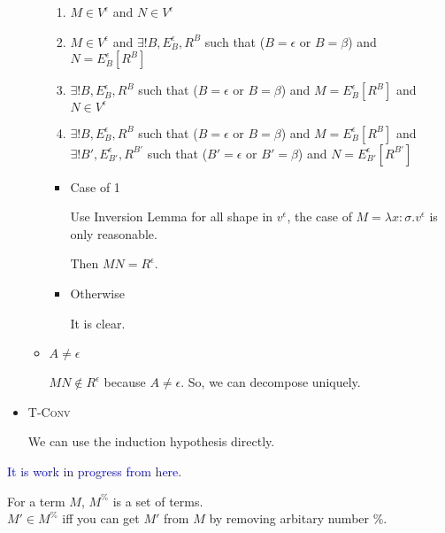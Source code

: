 \documentclass[9pt, a4paper]{extarticle}
\theoremstyle{break}
\newcommand{\TConv}{\textsc{T-Conv}}
\newcommand{\blue}[1]{\textcolor{blue}{ #1 }}
\begin{document}
\begin{itemize}
\begin{itemize}
		            \begin{enumerate}
			            \item $ M \in V^\epsilon$ and $ N \in V^\epsilon$
			            \item $ M \in V^\epsilon$ and $\exists ! B, E^\epsilon_B, R^B$ such that ($B = \epsilon$ or $B = \beta$) and $N = E^\epsilon_B[R^B]$
			            \item $\exists ! B, E^\epsilon_B, R^B$ such that ($B = \epsilon$ or $B = \beta$) and $M = E^\epsilon_B[R^B]$ and $ N \in V^\epsilon$
			            \item $\exists ! B, E^\epsilon_B, R^B$ such that ($B = \epsilon$ or $B = \beta$) and $M = E^\epsilon_B[R^B]$ and $\exists ! B', E^\epsilon_{B'}, R^{B'}$ such that ($B' = \epsilon$ or $B' = \beta$) and $N = E^\epsilon_{B'}[R^{B'}]$
		            \end{enumerate}

		            \begin{itemize}
			            \item Case of 1

			                  Use Inversion Lemma for all shape in $v^\epsilon$, the case of $ M = \lambda x:\sigma.v^\epsilon$ is only reasonable.

			                  Then $M N = R^\epsilon$.

			            \item Otherwise

			                  It is clear.
		            \end{itemize}

		      \item $ A \neq \epsilon $

		            $M N \notin R^\epsilon$ because $ A \neq \epsilon$.
		            So, we can decompose uniquely.

	      \end{itemize}


	\item \TConv

	      We can use the induction hypothesis directly.

\end{itemize}

\blue{\huge{It is work in progress from here.}}

\begin{dfn}
	For a term $M$, $M^\%$ is a set of terms.\\
	$M' \in M^\%$ iff you can get $M'$ from $M$ by removing arbitary number $\%$.
\end{dfn}
\end{document}
